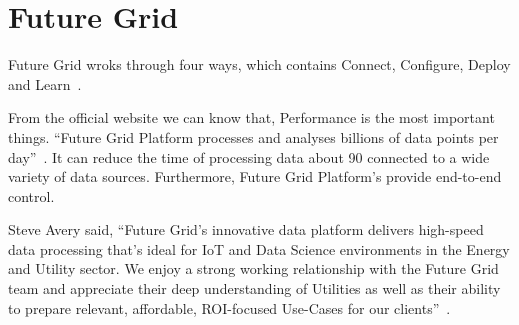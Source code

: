 \section{Future Grid}

Future Grid wroks through four ways, which contains Connect,
Configure, Deploy and Learn~\cite{www-futuregrid}.


From the official website we can know that, Performance is the 
most important things. ``Future Grid Platform processes and analyses
billions of data points per day''~\cite{www-futuregrid}. It can 
reduce the time of processing data about 90%
connected to a wide variety of data sources. Furthermore, Future 
Grid Platform's provide end-to-end control.


Steve Avery said, ``Future Grid’s innovative data platform delivers
high-speed data processing that’s ideal for IoT and Data Science 
environments in the Energy and Utility sector. We enjoy a strong 
working relationship with the Future Grid team and appreciate their 
deep understanding of Utilities as well as their ability to prepare 
relevant, affordable, ROI-focused Use-Cases for our clients''~\cite{www-futuregrid}. 

